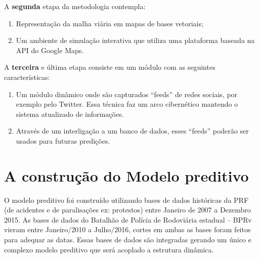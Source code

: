 A \textbf{segunda} etapa da metodologia contempla:
 \begin{enumerate}
    \item Representação da malha viária em mapas de bases vetoriais;
    \item Um ambiente de simulação interativa que utiliza uma plataforma baseada na API do Google Maps.
  \end{enumerate}

A \textbf{terceira} e última etapa consiste em um módulo com as seguintes características:
  \begin{enumerate}
     \item Um módulo dinâmico onde são capturados ``feeds'' de redes sociais, por exemplo pelo Twitter. 
	Essa técnica faz um arco cibernético mantendo o sistema atualizado de informações.
     \item Através de um interligação a um banco de dados, esses ``feeds'' poderão ser usados para futuras predições.
  \end{enumerate}


\pagebreak


\section{A construção do Modelo preditivo}

O modelo preditivo foi construído utilizando bases de dados históricas da PRF (de acidentes e de paralisações ex: protestos) entre Janeiro de 2007 a 
Dezembro 2015. As bases de dados do Batalhão de Polícia de Rodoviária estadual -- BPRv vieram entre Janeiro/2010 a Julho/2016, cortes em ambas as bases foram 
feitos para adequar as datas. Essas bases de dados são integradas gerando um único e complexo modelo preditivo que será acoplado a estrutura dinâmica.


